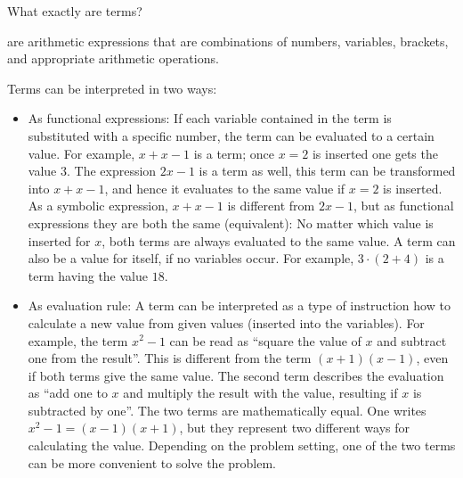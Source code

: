 \begin{MIntro}
What exactly are terms? 
\begin{MInfo}
 are arithmetic expressions that are combinations of numbers, variables, 
brackets, and appropriate arithmetic operations.
\end{MInfo}

Terms can be interpreted in two ways:
\begin{itemize}
\item{As functional expressions: If each variable contained in the term is substituted with a specific number, 
the term can be evaluated to a certain value. For example, $x+x-1$ is a term; once $x=2$ is inserted one gets the value $3$. The
expression $2x-1$ is a term as well, this term can be transformed into $x+x-1$, and hence it evaluates to the same value if $x=2$ is 
inserted. As a symbolic expression, $x+x-1$ is different from $2x-1$, but as functional expressions they are both the same (equivalent): 
No matter which value is inserted for $x$, both terms are always evaluated to the same value. A term can also be a value for itself, 
if no variables occur. For example, $3\cdot (2+4)$ is a term having the value $18$.}
\item{As evaluation rule: A term can be interpreted as a type of instruction how to calculate a new value from given values 
(inserted into the variables). For example, the term $x^2-1$ can be read as 
``square the value of $x$ and subtract one from the result''. This is different from
the term $(x+1)(x-1)$, even if both terms give the same value. The second term describes the evaluation as  
``add one to $x$ and multiply the result with the value, resulting if $x$ is subtracted by one''. The two terms are 
mathematically equal. One writes $x^2-1=(x-1)(x+1)$, but they represent two different ways for calculating the value. Depending on 
the problem setting, one of the two terms can be more convenient to solve the problem.}
\end{itemize}

\end{MIntro}


